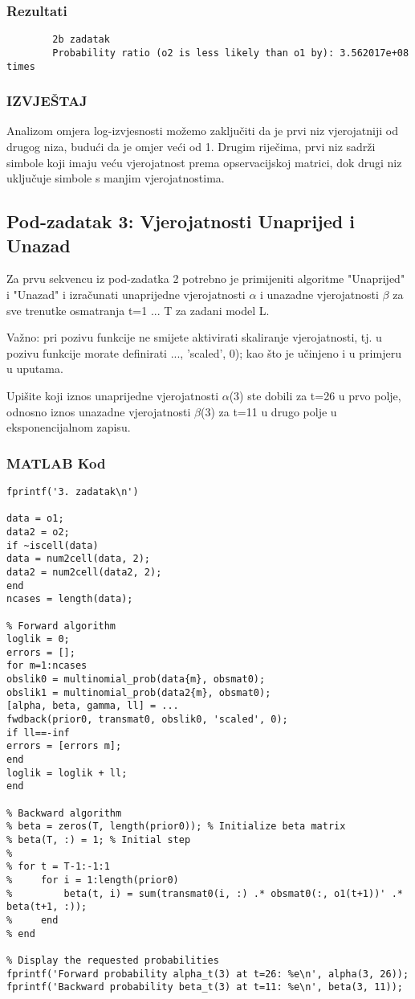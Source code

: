 \documentclass[12pt]{article}
\begin{document}
	\subsubsection*{Rezultati}
	\begin{verbatim}
		2b zadatak
		Probability ratio (o2 is less likely than o1 by): 3.562017e+08 times
	\end{verbatim}
	
	\subsubsection*{IZVJEŠTAJ}
	Analizom omjera log-izvjesnosti možemo zaključiti da je prvi niz vjerojatniji od drugog niza, budući da je omjer veći od 1. Drugim riječima, prvi niz sadrži simbole koji imaju veću vjerojatnost prema opservacijskoj matrici, dok drugi niz uključuje simbole s manjim vjerojatnostima.
	
	\subsection{Pod-zadatak 3: Vjerojatnosti Unaprijed i Unazad}
	Za prvu sekvencu iz pod-zadatka 2 potrebno je primijeniti algoritme "Unaprijed" i "Unazad" i izračunati unaprijedne vjerojatnosti $\alpha$ i unazadne vjerojatnosti $\beta$ za sve trenutke osmatranja t=1 ... T za zadani model L.
	
	Važno: pri pozivu funkcije ne smijete aktivirati skaliranje vjerojatnosti, tj. u pozivu funkcije morate definirati ..., 'scaled', 0); kao što je učinjeno i u primjeru u uputama.
	
	Upišite koji iznos unaprijedne vjerojatnosti $\alpha$(3) ste dobili za t=26 u prvo polje, odnosno iznos unazadne vjerojatnosti $\beta$(3) za t=11 u drugo polje u eksponencijalnom zapisu.
	
	\subsubsection*{MATLAB Kod}
	\begin{lstlisting}
fprintf('3. zadatak\n')      

data = o1;
data2 = o2;
if ~iscell(data)
data = num2cell(data, 2);
data2 = num2cell(data2, 2);
end
ncases = length(data);

% Forward algorithm
loglik = 0;
errors = [];
for m=1:ncases
obslik0 = multinomial_prob(data{m}, obsmat0);
obslik1 = multinomial_prob(data2{m}, obsmat0);
[alpha, beta, gamma, ll] = ...
fwdback(prior0, transmat0, obslik0, 'scaled', 0); 
if ll==-inf
errors = [errors m];
end
loglik = loglik + ll;
end

% Backward algorithm
% beta = zeros(T, length(prior0)); % Initialize beta matrix
% beta(T, :) = 1; % Initial step
% 
% for t = T-1:-1:1
%     for i = 1:length(prior0)
%         beta(t, i) = sum(transmat0(i, :) .* obsmat0(:, o1(t+1))' .* beta(t+1, :));
%     end
% end

% Display the requested probabilities
fprintf('Forward probability alpha_t(3) at t=26: %e\n', alpha(3, 26));
fprintf('Backward probability beta_t(3) at t=11: %e\n', beta(3, 11));
	\end{lstlisting}
	
\end{document}
